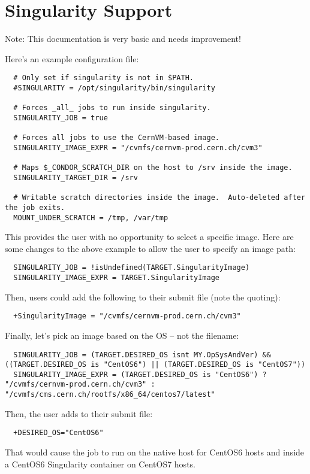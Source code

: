 \section{Singularity Support}\label{sec:singularity-support}


Note:  This documentation is very basic and needs improvement!

Here's an example configuration file:

\begin{verbatim}
  # Only set if singularity is not in $PATH.
  #SINGULARITY = /opt/singularity/bin/singularity

  # Forces _all_ jobs to run inside singularity.
  SINGULARITY_JOB = true

  # Forces all jobs to use the CernVM-based image.
  SINGULARITY_IMAGE_EXPR = "/cvmfs/cernvm-prod.cern.ch/cvm3"

  # Maps $_CONDOR_SCRATCH_DIR on the host to /srv inside the image.
  SINGULARITY_TARGET_DIR = /srv

  # Writable scratch directories inside the image.  Auto-deleted after the job exits.
  MOUNT_UNDER_SCRATCH = /tmp, /var/tmp
\end{verbatim}

This provides the user with no opportunity to select a specific image.
Here are some changes to the above example to allow the user to specify an
image path:

\begin{verbatim}
  SINGULARITY_JOB = !isUndefined(TARGET.SingularityImage)
  SINGULARITY_IMAGE_EXPR = TARGET.SingularityImage
\end{verbatim}

Then, users could add the following to their submit file
(note the quoting):

\begin{verbatim}
  +SingularityImage = "/cvmfs/cernvm-prod.cern.ch/cvm3"
\end{verbatim}

Finally, let's pick an image based on the OS -- not the filename:

\begin{verbatim}
  SINGULARITY_JOB = (TARGET.DESIRED_OS isnt MY.OpSysAndVer) && ((TARGET.DESIRED_OS is "CentOS6") || (TARGET.DESIRED_OS is "CentOS7"))
  SINGULARITY_IMAGE_EXPR = (TARGET.DESIRED_OS is "CentOS6") ? "/cvmfs/cernvm-prod.cern.ch/cvm3" : "/cvmfs/cms.cern.ch/rootfs/x86_64/centos7/latest"
\end{verbatim}

Then, the user adds to their submit file:

\begin{verbatim}
  +DESIRED_OS="CentOS6"
\end{verbatim}

That would cause the job to run on the native host for CentOS6 hosts
and inside a CentOS6 Singularity container on CentOS7 hosts.
